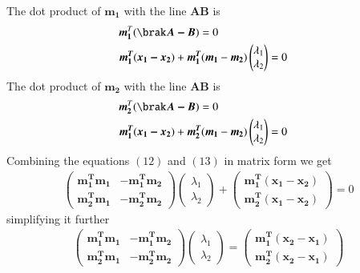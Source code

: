 \documentclass[journal,12pt,twocolumn]{IEEEtran}
\begin{document}
The dot product of $\bm{m_1}$ with the line $\bm{AB}$ is
\begin{align}
    \bm{m_1}^T(\brak\bm{A-B})=0\notag\\
    \bm{m_1^T}(\bm{x_1-x_2})+\bm{m_1^T}(\bm{m_1} & -\bm{m_2})\begin{pmatrix}\lambda_1 \\ \lambda_2\end{pmatrix}=0
\end{align}
The dot product of $\bm{m_2}$ with the line $\bm{AB}$ is\\
\begin{align}
    \bm{m_2}^T(\brak\bm{A-B})=0\notag\\
    \bm{m_1^T}(\bm{x_1-x_2})+\bm{m_2^T}(\bm{m_1} & -\bm{m_2})\begin{pmatrix}\lambda_1 \\ \lambda_2\end{pmatrix}=0
\end{align}
\vspace{3mm}
Combining the equations $(12)$ and $(13)$ in matrix form we get\\
\begin{align}
    \begin{pmatrix}\bm{m_1^T}\bm{m_1} & -\bm{m_1^T}\bm{m_2}\\\bm{m_2^T}\bm{m_1} &  -\bm{m_2^T}\bm{m_2}\end{pmatrix}\begin{pmatrix}\lambda_1\\\lambda_2\end{pmatrix}+\begin{pmatrix}\bm{m_1^T}\bm{(x_1-x_2)}\\\bm{m_2^T}\bm{(x_1-x_2)}\end{pmatrix}=0
\end{align}
simplifying it further\\
\begin{align}
    \begin{pmatrix}\bm{m_1^T}\bm{m_1} & -\bm{m_1^T}\bm{m_2}\\\bm{m_2^T}\bm{m_1} &  -\bm{m_2^T}\bm{m_2}\end{pmatrix}\begin{pmatrix}\lambda_1\\\lambda_2\end{pmatrix}=\begin{pmatrix}\bm{m_1^T}\bm{(x_2-x_1)}\\\bm{m_2^T}\bm{(x_2-x_1)}\end{pmatrix}
\end{align}
\end{document}
